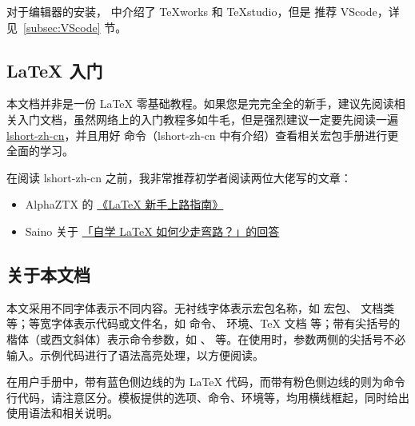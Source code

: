 对于编辑器的安装， 中介绍了 TeXworks 和 \TeX studio，但是  推荐 VScode，详见~\ref{subsec:VScode} 节。



\subsection{\LaTeX{} 入门}

本文档并非是一份 \LaTeX{} 零基础教程。如果您是完完全全的新手，建议先阅读相关入门文档，虽然网络上的入门教程多如牛毛，但是强烈建议一定要先阅读一遍 \href{https://ctan.math.illinois.edu/info/lshort/chinese/lshort-zh-cn.pdf}{lshort-zh-cn}，并且用好  命令（lshort-zh-cn 中有介绍）查看相关宏包手册进行更全面的学习。

在阅读 lshort-zh-cn 之前，我非常推荐初学者阅读两位大佬写的文章：
\begin{itemize}
  \item AlphaZTX 的 \href{https://zhuanlan.zhihu.com/p/433710726}{《LaTeX 新手上路指南》}
  \item Saino 关于 \href{https://www.zhihu.com/question/30620276/answer/2653842413}{「自学 LaTeX 如何少走弯路？」的回答}
\end{itemize}


\subsection{关于本文档} \label{subsec:提issues}

本文采用不同字体表示不同内容。无衬线字体表示宏包名称，如
 宏包、 文档类等；等宽字体表示代码或文件名，如  命令、 环境、\TeX{} 文档 等；带有尖括号的楷体（或西文斜体）表示命令参数，如 、 等。在使用时，参数两侧的尖括号不必输入。示例代码进行了语法高亮处理，以方便阅读。

在用户手册中，带有蓝色侧边线的为 \LaTeX{} 代码，而带有粉色侧边线的则为命令行代码，请注意区分。模板提供的选项、命令、环境等，均用横线框起，同时给出使用语法和相关说明。

